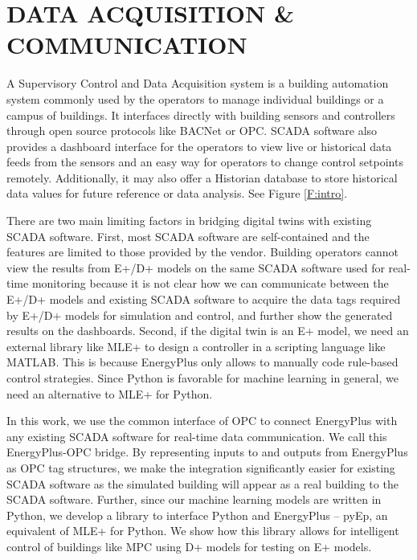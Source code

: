 \section{DATA ACQUISITION \& COMMUNICATION}

A Supervisory Control and Data Acquisition system is a building automation system commonly used by the operators to manage individual buildings or a campus of buildings. 
It interfaces directly with building sensors and controllers through open source protocols like BACNet or OPC. 
SCADA software also provides a dashboard interface for the operators to view live or historical data feeds from the sensors and an easy way for operators to change control setpoints remotely. 
Additionally, it may also offer a Historian database to store historical data values for future reference or data analysis. See Figure \ref{F:intro}.

There are two main limiting factors in bridging digital twins with existing SCADA software.
First, most SCADA software are self-contained and the features are limited to those provided by the vendor.
Building operators cannot view the results from E+/D+ models on the same SCADA software used for real-time monitoring because it is not clear how we can communicate between the E+/D+ models and existing SCADA software to acquire the data tags required by E+/D+ models for simulation and control, and further show the generated results on the dashboards.
Second, if the digital twin is an E+ model, we need an external library like MLE+ \cite{bernaletal12mti} to design a controller in a scripting language like MATLAB. This is because EnergyPlus only allows to manually code rule-based control strategies.
Since Python is favorable for machine learning in general, we need an alternative to MLE+ for Python. 

In this work, we use the common interface of OPC to connect EnergyPlus with any existing SCADA software for real-time data communication. 
We call this EnergyPlus-OPC bridge.
By representing inputs to and outputs from EnergyPlus as OPC tag structures, we make the integration significantly easier for existing SCADA software as the simulated building will appear as a real building to the SCADA software.
Further, since our machine learning models are written in Python, we develop a library to interface Python and EnergyPlus -- pyEp, an equivalent of MLE+ for Python.
We show how this library allows for intelligent control of buildings like MPC using D+ models for testing on E+ models.


